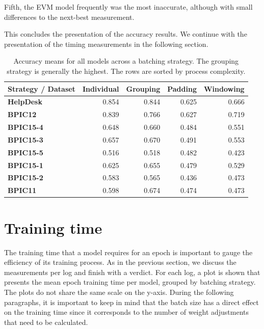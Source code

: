 Fifth, the EVM model frequently was the most inaccurate, although with small differences to the next-best measurement.

This concludes the presentation of the accuracy results.
We continue with the presentation of the timing measurements in the following section.

\begin{table}
\centering
\begin{tabular}{p{3cm}rrrr}
\textbf{Strategy / Dataset}  &  \textbf{Individual} &  \textbf{Grouping} &   \textbf{Padding} &  \textbf{Windowing}\\
\midrule
\textbf{HelpDesk} &       0.854 &    0.844 &   0.625 &     0.666 \\
\textbf{BPIC12  } &       0.839 &    0.766 &   0.627 &     0.719 \\
\textbf{BPIC15-4} &       0.648 &    0.660 &   0.484 &     0.551 \\
\textbf{BPIC15-3} &       0.657 &    0.670 &   0.491 &     0.553 \\
\textbf{BPIC15-5} &       0.516 &    0.518 &   0.482 &     0.423 \\
\textbf{BPIC15-1} &       0.625 &    0.655 &   0.479 &     0.529 \\
\textbf{BPIC15-2} &       0.583 &    0.565 &   0.436 &     0.473 \\
\textbf{BPIC11  } &       0.598 &    0.674 &   0.474 &     0.473 \\
\end{tabular}
\caption[Mean accuracies per batching strategy]{Accuracy means for all models across a batching strategy. The grouping strategy is generally the highest. The rows are sorted by process complexity.}
\label{tab:strategy-top-accuracies}
\end{table}


\section{Training time}\label{sec:eval:training-time}
The training time that a model requires for an epoch is important to gauge the efficiency of its training process.
As in the previous section, we discuss the measurements per log and finish with a verdict.
For each log, a plot is shown that presents the mean epoch training time per model, grouped by batching strategy.
The plots do not share the same scale on the y-axis.
During the following paragraphs, it is important to keep in mind that the batch size has a direct effect on the training time since it corresponds to the number of weight adjustments that need to be calculated.

